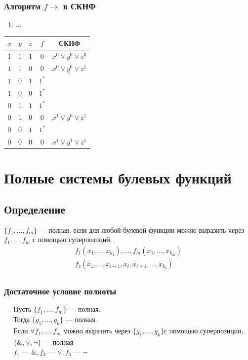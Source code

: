 \documentclass{article}
\begin{document}
\subsubsection{Алгоритм $f \to$ в СКНФ}
\begin{enumerate}
    \item ...
\end{enumerate}

\begin{tabular}{c|c|c|c|c}
    $x$ & $y$ & $z$ & $f$   & СКНФ                    \\
    \hline
    $1$ & $1$ & $1$ & $0$   & $x^0 \vee y^0 \vee z^0$ \\  
    $1$ & $1$ & $0$ & $0$   & $x^0 \vee y^0 \vee z^1$ \\
    $1$ & $0$ & $1$ & $1^*$ &                         \\
    $1$ & $0$ & $0$ & $1^*$ &                         \\
    $0$ & $1$ & $1$ & $1^*$ &                         \\
    $0$ & $1$ & $0$ & $0$   & $x^1 \vee y^0 \vee z^1$ \\
    $0$ & $0$ & $1$ & $1^*$ &                         \\
    $0$ & $0$ & $0$ & $0$   & $x^1 \vee y^1 \vee z^1$
\end{tabular}



\section{Полные системы булевых функций}

\subsection{Определение}
    $\{f_1, \dots, f_m\}$ --- полная, если для любой булевой функции можно выразить через \\
    $f_1, \dots, f_m$ с помощью суперпозиций. 
\begin{gather*}
    f_1(x_1, \dots, x_{k_1}), \dots, f_m(x_1, \dots, x_{k_m}) \\
    f_z(x_1, \dots, x_{i - 1}, x_i, x_{i + 1}, \dots, x_{k_t}) \\
\end{gather*}

\subsubsection{Достаточное условие полноты}
\begin{gather*}
    \text{Пусть } \{f_1, \dots, f_m\} \text{ --- полная.} \\
    \text{Тогда } \{g_1, \dots, g_k\} \text{ --- полная.} \\
    \text{Если  } \forall f_1, \dots, f_m \text{ можно выразить через } \{g_1, \dots, g_k\} \text{с помощью суперпозиции}. \\
    \{\&, \vee, \neg\} \text{ --- полная} \\
    f_1 \text{ --- } \&, f_2 \text{ --- } \vee, f_3 \text{ --- } \neg \\
\end{gather*}
\end{document}
